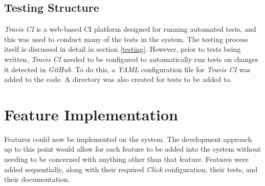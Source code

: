 \subsection{Testing Structure}
\label{testing_structure}
\textit{Travis CI} \cite{travis_ci} is a web-based CI platform designed for running automated tests, and this was used to conduct many of the tests in the system.
The testing process itself is discussed in detail in section \ref{testing}.
However, prior to tests being written, \textit{Travis CI} needed to be configured to automatically run tests on changes it detected in \textit{GitHub}.
To do this, a \textit{YAML} configuration file for \textit{Travis CI} was added to the code.
A directory was also created for tests to be added to.

\section{Feature Implementation}
\label{features}
Features could now be implemented on the system.
The development approach up to this point would allow for each feature to be added into the system without needing to be concerned with anything other than that feature.
Features were added sequentially, along with their required \textit{Click} configuration, their tests, and their documentation.


